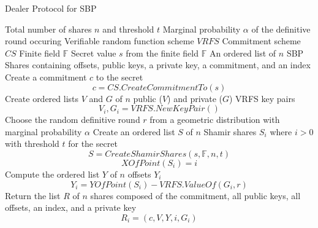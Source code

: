 \documentclass{dalcsthesis}
\begin{document}
\begin{algorithm}
  \caption{Dealer Protocol for SBP}
  \label{alg:SBP:Dealer}
  \begin{algorithmic}
    \INPUT Total number of shares $n$ and threshold $t$
    \INPUT Marginal probability $\alpha$ of the definitive round occuring
    \INPUT Verifiable random function scheme $VRFS$
    \INPUT Commitment scheme $CS$
    \INPUT Finite field $\mathbb{F}$
    \INPUT Secret value $s$ from the finite field $\mathbb{F}$
    \OUTPUT An ordered list of $n$ SBP Shares containing offsets, public keys, a private key, a commitment, and an index
    \STATE Create a commitment $c$ to the secret
    	$$c = CS.CreateCommitmentTo(s)$$
    \STATE Create ordered lists $V$ and $G$ of $n$ public ($V$) and private ($G$) VRFS key pairs
    	$$V_i, G_i = VRFS.NewKeyPair()$$
    \STATE Choose the random definitive round $r$ from a geometric distribution with marginal probability $\alpha$
    \STATE Create an ordered list $S$ of $n$ Shamir shares $S_i$ where $i > 0$ with threshold $t$ for the secret
    	$$S = CreateShamirShares(s, \mathbb{F}, n, t)$$
    	$$XOfPoint(S_i) = i$$
    \STATE Compute the ordered list $Y$ of $n$ offsets $Y_i$
    	$$Y_i = YOfPoint(S_i) - VRFS.ValueOf(G_i, r)$$
    \STATE Return the list $R$ of $n$ shares composed of the commitment, all public keys, all offsets, an index, and a private key
    	$$R_i = (c, V, Y, i, G_i)$$
  \end{algorithmic}
\end{algorithm}
\end{document}
